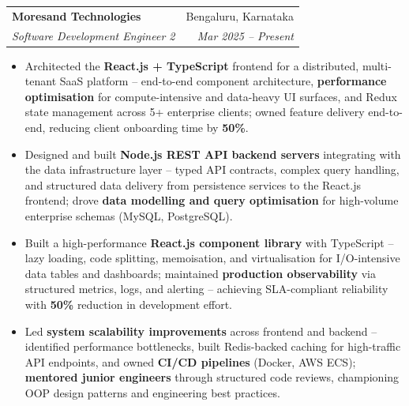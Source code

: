 \documentclass[a4paper,20pt]{article}
\makeatletter
\newcommand{\resumeSubheading}[4]{\vspace{-1pt}\item\begin{tabular*}{0.97\textwidth}{l@{\extracolsep{\fill}}r}\textbf{#1} & #2 \\\textit{#3} & \textit{#4} \\\end{tabular*}\vspace{-5pt}}
\newcommand{\resumeItemListStart}{\begin{itemize}}
\newcommand{\resumeItemListEnd}{\end{itemize}\vspace{-5pt}}
\makeatother
\begin{document}
    \resumeSubheading
      {Moresand Technologies}{Bengaluru, Karnataka}
      {Software Development Engineer 2}{Mar 2025 -- Present}
      \resumeItemListStart
        \item\small{Architected the \textbf{React.js + TypeScript} frontend for a distributed, multi-tenant SaaS platform -- end-to-end component architecture, \textbf{performance optimisation} for compute-intensive and data-heavy UI surfaces, and Redux state management across 5+ enterprise clients; owned feature delivery end-to-end, reducing client onboarding time by \textbf{50\%}.}
        \item\small{Designed and built \textbf{Node.js REST API backend servers} integrating with the data infrastructure layer -- typed API contracts, complex query handling, and structured data delivery from persistence services to the React.js frontend; drove \textbf{data modelling and query optimisation} for high-volume enterprise schemas (MySQL, PostgreSQL).}
        \item\small{Built a high-performance \textbf{React.js component library} with TypeScript -- lazy loading, code splitting, memoisation, and virtualisation for I/O-intensive data tables and dashboards; maintained \textbf{production observability} via structured metrics, logs, and alerting -- achieving SLA-compliant reliability with \textbf{50\%} reduction in development effort.}
        \item\small{Led \textbf{system scalability improvements} across frontend and backend -- identified performance bottlenecks, built Redis-backed caching for high-traffic API endpoints, and owned \textbf{CI/CD pipelines} (Docker, AWS ECS); \textbf{mentored junior engineers} through structured code reviews, championing OOP design patterns and engineering best practices.}
      \resumeItemListEnd
\end{document}
